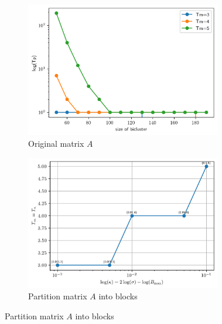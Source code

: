 \documentclass{beamer}
\begin{document}
\begin{frame}
\begin{columns}
\begin{column}{0.5\textwidth}
        \end{column}
        \begin{column}{0.5\textwidth}
            \vspace{-1cm}
            \centering
            \begin{figure}[htb]
                \centering
                \begin{subfigure}[b]{\textwidth}
                    \centering
                    \includegraphics[width=\linewidth]{Tp.png}
                    \caption{Original matrix $A$}
                    \label{fig:image1}
                \end{subfigure}
                \begin{subfigure}[b]{\textwidth}
                    \centering
                    \includegraphics[width=\linewidth]{Tm.png}
                    \caption{Partition matrix $A$ into blocks}
                    \label{fig:image2}
                \end{subfigure}
                \vspace{-0.8cm}
            \end{figure}
        \end{column}
    \end{columns}

\end{frame}
\end{document}
